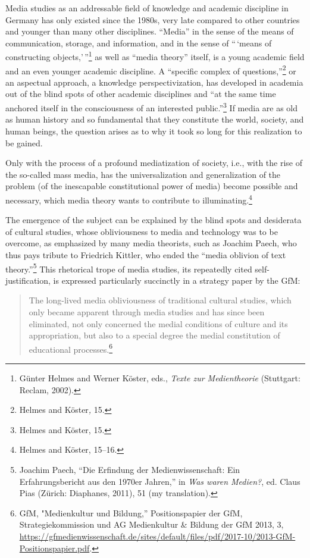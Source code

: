 \documentclass{tufte-handout}
\begin{document}
Media studies as an addressable field of knowledge and academic
discipline in Germany has only existed since the 1980s, very late
compared to other countries and younger than many other disciplines.
``Media'' in the sense of the means of communication, storage, and
information, and in the sense of ``\,`means of constructing
objects,'\,''\footnote{Günter Helmes and Werner Köster, eds.,
  \emph{Texte zur Medientheorie} (Stuttgart: Reclam, 2002).} as well as
``media theory'' itself, is a young academic field and an even younger
academic discipline. A ``specific complex of questions,''\footnote{Helmes
  and Köster\emph{,} 15.} or an aspectual approach, a knowledge
perspectivization, has developed in academia out of the blind spots of
other academic disciplines and ``at the same time anchored itself in the
consciousness of an interested public.''\footnote{Helmes and Köster, 15.}
If media are as old as human history and so fundamental that they
constitute the world, society, and human beings, the question arises as
to why it took so long for this realization to be gained.

Only with the process of a profound mediatization of society, i.e., with
the rise of the so-called mass media, has the universalization and
generalization of the problem (of the inescapable constitutional power
of media) become possible and necessary, which media theory wants to
contribute to illuminating.\footnote{Helmes and Köster, 15--16.}

The emergence of the subject can be explained by the blind spots and
desiderata of cultural studies, whose obliviousness to media and
technology was to be overcome, as emphasized by many media theorists,
such as Joachim Paech, who thus pays tribute to Friedrich Kittler, who
ended the ``media oblivion of text theory.''\footnote{Joachim Paech,
  ``Die Erfindung der Medienwissenschaft: Ein Erfahrungsbericht aus den
  1970er Jahren,'' in \emph{Was waren Medien?}, ed. Claus Pias (Zürich:
  Diaphanes, 2011), 51 (my translation).} This rhetorical trope of media
studies, its repeatedly cited self-justification, is expressed
particularly succinctly in a strategy paper by the GfM:

\begin{quote}
The long-lived media obliviousness of traditional cultural studies,
which only became apparent through media studies and has since been
eliminated, not only concerned the medial conditions of culture and its
appropriation, but also to a special degree the medial constitution of
educational processes.\footnote{GfM, "Medienkultur und Bildung,''
  Positionspapier der GfM, Strategiekommission und AG Medienkultur \&
  Bildung der GfM 2013, 3,
  \url{https://gfmedienwissenschaft.de/sites/default/files/pdf/2017-10/2013-GfM-Positionspapier.pdf}.}
\end{quote}
\end{document}
